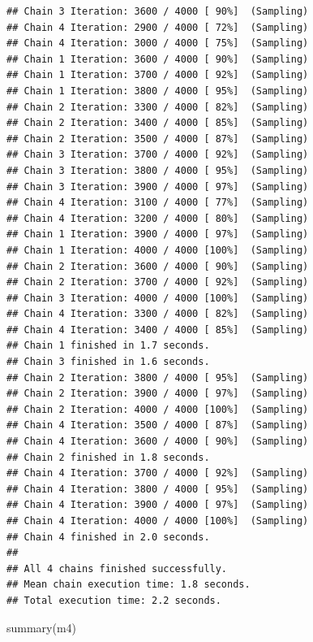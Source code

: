 \documentclass[
]{article}
\newenvironment{Shaded}{\begin{snugshade}}{\end{snugshade}}
\newcommand{\FunctionTok}[1]{\textcolor[rgb]{0.00,0.00,0.00}{#1}}
\newcommand{\NormalTok}[1]{#1}
\begin{document}
\begin{verbatim}
## Chain 3 Iteration: 3600 / 4000 [ 90%]  (Sampling) 
## Chain 4 Iteration: 2900 / 4000 [ 72%]  (Sampling) 
## Chain 4 Iteration: 3000 / 4000 [ 75%]  (Sampling) 
## Chain 1 Iteration: 3600 / 4000 [ 90%]  (Sampling) 
## Chain 1 Iteration: 3700 / 4000 [ 92%]  (Sampling) 
## Chain 1 Iteration: 3800 / 4000 [ 95%]  (Sampling) 
## Chain 2 Iteration: 3300 / 4000 [ 82%]  (Sampling) 
## Chain 2 Iteration: 3400 / 4000 [ 85%]  (Sampling) 
## Chain 2 Iteration: 3500 / 4000 [ 87%]  (Sampling) 
## Chain 3 Iteration: 3700 / 4000 [ 92%]  (Sampling) 
## Chain 3 Iteration: 3800 / 4000 [ 95%]  (Sampling) 
## Chain 3 Iteration: 3900 / 4000 [ 97%]  (Sampling) 
## Chain 4 Iteration: 3100 / 4000 [ 77%]  (Sampling) 
## Chain 4 Iteration: 3200 / 4000 [ 80%]  (Sampling) 
## Chain 1 Iteration: 3900 / 4000 [ 97%]  (Sampling) 
## Chain 1 Iteration: 4000 / 4000 [100%]  (Sampling) 
## Chain 2 Iteration: 3600 / 4000 [ 90%]  (Sampling) 
## Chain 2 Iteration: 3700 / 4000 [ 92%]  (Sampling) 
## Chain 3 Iteration: 4000 / 4000 [100%]  (Sampling) 
## Chain 4 Iteration: 3300 / 4000 [ 82%]  (Sampling) 
## Chain 4 Iteration: 3400 / 4000 [ 85%]  (Sampling) 
## Chain 1 finished in 1.7 seconds.
## Chain 3 finished in 1.6 seconds.
## Chain 2 Iteration: 3800 / 4000 [ 95%]  (Sampling) 
## Chain 2 Iteration: 3900 / 4000 [ 97%]  (Sampling) 
## Chain 2 Iteration: 4000 / 4000 [100%]  (Sampling) 
## Chain 4 Iteration: 3500 / 4000 [ 87%]  (Sampling) 
## Chain 4 Iteration: 3600 / 4000 [ 90%]  (Sampling) 
## Chain 2 finished in 1.8 seconds.
## Chain 4 Iteration: 3700 / 4000 [ 92%]  (Sampling) 
## Chain 4 Iteration: 3800 / 4000 [ 95%]  (Sampling) 
## Chain 4 Iteration: 3900 / 4000 [ 97%]  (Sampling) 
## Chain 4 Iteration: 4000 / 4000 [100%]  (Sampling) 
## Chain 4 finished in 2.0 seconds.
## 
## All 4 chains finished successfully.
## Mean chain execution time: 1.8 seconds.
## Total execution time: 2.2 seconds.
\end{verbatim}

\begin{Shaded}
\begin{Highlighting}[]
\FunctionTok{summary}\NormalTok{(m4)}
\end{Highlighting}
\end{Shaded}
\end{document}
